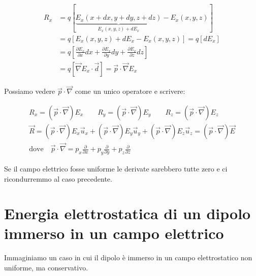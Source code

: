 \begin{align*}
	R_x &=  q [ \underbrace{E_x  (x+dx,y+dy,z+dz)}_{E_x(x,y,z) +dE_x} - E_x  (x,y,z) ]  \tag*{teo. differenziale totale} \\
	&= q [E_x  (x,y,z) + dE_x - E_x  (x,y,z)] = q[dE_x ] \\
	&= q\left[ \frac{\partial E_x}{\partial x} dx + \frac{\partial E_x}{\partial y} dy + \frac{\partial E_x}{\partial z} dz \right] \\
	&= q \left[ \vec{\nabla} E_x \cdot \vec{d} \right] = \vec{p} \cdot \vec{\nabla} E_x
\end{align*}

Possiamo vedere $\vec{p} \cdot \vec{\nabla}$ come un unico operatore e scrivere:

\begin{gather*}
	R_x  = \left( \vec{p} \cdot \vec{\nabla}  \right)  E_x \qquad R_y  = \left( \vec{p} \cdot \vec{\nabla}  \right)  E_y \qquad R_z  = \left( \vec{p} \cdot \vec{\nabla}  \right)  E_z \\
	\boxed{\vec{R} = \left( \vec{p} \cdot \vec{\nabla}  \right)E_x\vec{u}_x + \left( \vec{p} \cdot \vec{\nabla}  \right) E_y\vec{u}_y + \left( \vec{p} \cdot \vec{\nabla}  \right) E_z\vec{u}_z = \left( \vec{p} \cdot \vec{\nabla}  \right)\vec{E}} \\
	\text{dove} \quad \vec{p} \cdot \vec{\nabla} = p_x \frac{\partial}{\partial x} + p_y \frac{\partial}{\partial y} + p_z \frac{\partial}{\partial z}
\end{gather*}

Se il campo elettrico fosse uniforme le derivate sarebbero tutte zero e ci ricondurremmo al caso precedente.

\section{Energia elettrostatica di un dipolo immerso in un campo elettrico}

Immaginiamo un caso in cui il dipolo è immerso in un campo elettrostatico non uniforme, ma conservativo.

